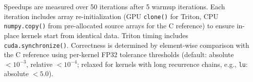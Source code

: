 Speedups are measured over 50 iterations after 5 warmup iterations. Each iteration includes array re-initialization (GPU \texttt{clone()} for Triton, CPU \texttt{numpy.copy()} from pre-allocated source arrays for the C reference) to ensure in-place kernels start from identical data. Triton timing includes \texttt{cuda.synchronize()}.
Correctness is determined by element-wise comparison with the C reference using per-kernel FP32 tolerance thresholds (default: absolute $<10^{-3}$, relative $<10^{-4}$; relaxed for kernels with long recurrence chains, e.g., \texttt{lu}: absolute $<5.0$).
